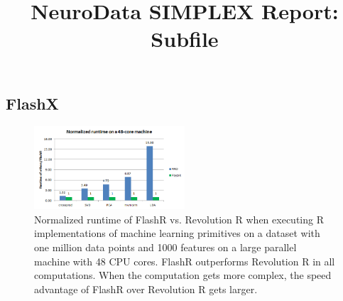 \documentclass[simplex.tex]{subfiles}
\title{NeuroData SIMPLEX Report: Subfile}
\begin{document}


\subsection{FlashX}

\begin{figure}[h!]
\begin{cframed}
\centering
\includegraphics[width=0.5\textwidth]{../../figs/FlashR.vs.RRO.png}
\caption{
Normalized runtime of FlashR vs. Revolution R when executing R implementations
of machine learning primitives on a dataset with one million data points and
1000 features on a large parallel machine with
48 CPU cores. FlashR outperforms Revolution R in all computations. When
the computation gets more complex, the speed advantage of FlashR
over Revolution R gets larger.
}
\label{fig:flashr}
\end{cframed}
\end{figure}
\end{document}
